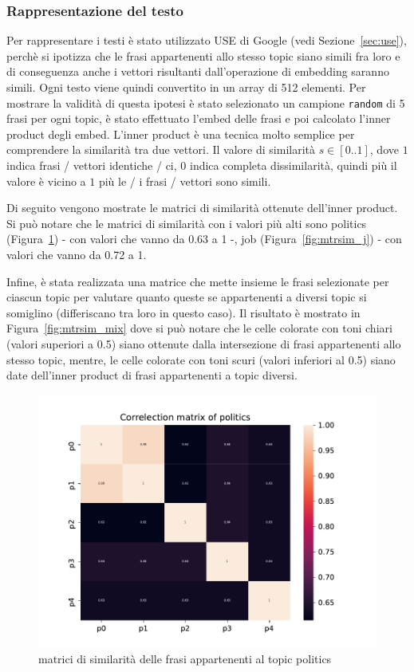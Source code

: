 \subsubsection{Rappresentazione del testo}
\label{sssec:rappresentazione}
Per rappresentare i testi è stato utilizzato USE di Google (vedi Sezione~\ref{sec:use}), perchè si ipotizza che le frasi appartenenti allo stesso topic siano simili fra loro e di conseguenza anche i vettori risultanti dall'operazione di embedding saranno simili. Ogni testo viene quindi convertito in un array di 512 elementi. Per mostrare la validità di questa ipotesi è stato selezionato un campione {\tt random} di 5 frasi per ogni topic, è stato effettuato l'embed delle frasi e poi calcolato l'inner product degli embed. L'inner product è una tecnica molto semplice per comprendere la similarità tra due vettori. Il valore di similarità $s \in [0..1]$, dove $1$ indica frasi / vettori identiche / ci, $0$ indica completa dissimilarità, quindi più il valore è vicino a $1$ più le / i frasi / vettori sono simili.

Di seguito vengono mostrate le matrici di similarità ottenute dell'inner product. Si può notare che le matrici di similarità con i valori più alti sono politics (Figura~\ref{fig:mtrsim_p}) - con valori che vanno da 0.63 a 1 -, job (Figura~\ref{fig:mtrsim_j}) - con valori che vanno da 0.72 a 1.

Infine, è stata realizzata una matrice che mette insieme le frasi selezionate per ciascun topic per valutare quanto queste se appartenenti a diversi topic si somiglino (differiscano tra loro in questo caso). Il risultato è mostrato in Figura~\ref{fig:mtrsim_mix} dove si può notare che le celle colorate con toni chiari (valori superiori a 0.5) siano ottenute dalla intersezione di frasi appartenenti allo stesso topic, mentre, le celle colorate con toni scuri (valori inferiori al 0.5) siano date dell'inner product di frasi appartenenti a topic diversi.

\begin{figure}[h!t]
    \centering
    \includegraphics{Figure/simMatr/politics.pdf}
    \caption{matrici di similarità delle frasi appartenenti al topic politics}
    \label{fig:mtrsim_p}
\end{figure}
\FloatBarrier

